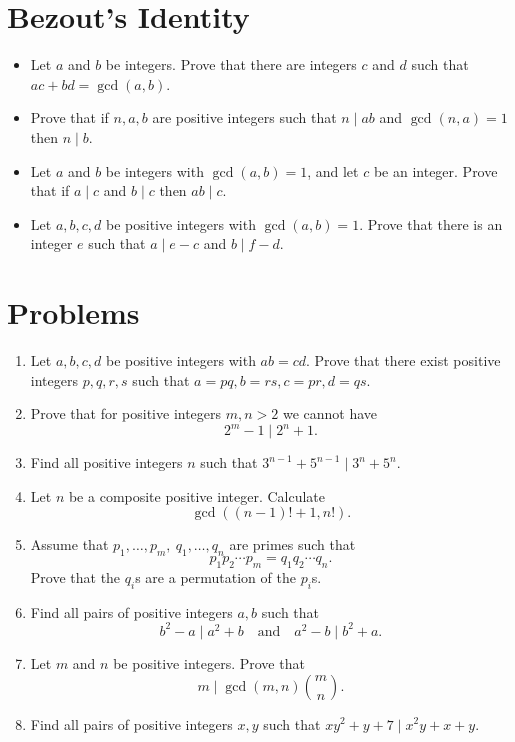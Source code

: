 \documentclass{article}
\begin{document}
\section{Bezout's Identity}
  \begin{itemize}
    \item Let $a$ and $b$ be integers. Prove that there are integers $c$ and $d$
      such that $ac+bd=\gcd(a,b)$.
    \item Prove that if $n,a,b$ are positive integers such that $n\mid ab$ and
      $\gcd(n,a)=1$ then $n\mid b$.
    \item Let $a$ and $b$ be integers with $\gcd(a,b)=1$, and let $c$ be an
      integer. Prove that if $a\mid c$ and $b\mid c$ then $ab\mid c$.
    \item Let $a,b,c,d$ be positive integers with $\gcd(a,b)=1$. Prove that there is an integer $e$
      such that $a\mid e-c$ and $b\mid f-d$.
  \end{itemize}
\section{Problems}
  \begin{enumerate}
    \item Let $a,b,c,d$ be positive integers with $ab=cd$. Prove that there
      exist positive integers $p,q,r,s$ such that \(a=pq,b=rs,c=pr,d=qs\).
    \item Prove that for positive integers $m,n>2$ we cannot have \[2^m-1\mid
        2^n+1.\]
    \item Find all positive integers $n$ such that $3^{n-1}+5^{n-1}\mid
      3^n+5^n$.
    \item Let $n$ be a composite positive integer. Calculate
      \[\gcd((n-1)!+1,n!).\]
    \item Assume that $p_1,\ldots,p_m,\ q_1,\ldots,q_n$ are primes such that
      \[p_1p_2\cdots p_m=q_1q_2\cdots q_n.\]
      Prove that the $q_i$s are a permutation of the $p_i$s.
    \item Find all pairs of positive integers $a,b$ such that \[b^2-a\mid
        a^2+b\quad\text{and}\quad a^2-b\mid b^2+a.\]
    \item Let $m$ and $n$ be positive integers. Prove that
      \[m\mid\gcd(m,n)\binom mn.\]
    \item Find all pairs of positive integers $x,y$ such that $xy^2+y+7\mid
      x^2y+x+y$.
  \end{enumerate}
\newpage
\end{document}

